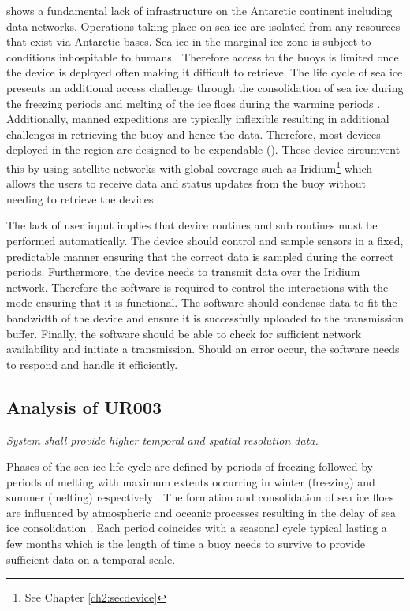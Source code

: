 \textcite{kennicutt2016delivering} shows a fundamental lack of infrastructure on the Antarctic continent including data networks. Operations taking place on sea ice are isolated from any resources that exist via Antarctic bases. Sea ice in the marginal ice zone is subject to conditions inhospitable to humans \cite{kennicutt2016delivering}. Therefore access to the buoys is limited once the device is deployed often making it difficult to retrieve. The life cycle of sea ice presents an additional access challenge through the consolidation of sea ice  during the freezing periods and melting  of the ice floes during the warming periods \cite{womack_2020}. Additionally, manned expeditions are typically inflexible \cite{kennicutt2016delivering} resulting in additional challenges in retrieving the buoy and hence the data. Therefore, most devices deployed in the region are designed to be expendable (\cite{kohout2015device,rabault2019open,trident}). These device circumvent this by using satellite networks with global coverage such as Iridium\footnote{See Chapter \ref{ch2:secdevice}} which allows the users to receive data and status updates from the buoy without needing to retrieve the devices. 

The lack of user input implies that device routines and sub routines must be performed automatically. The device should control and sample sensors in a fixed, predictable manner ensuring that the correct data is sampled during the correct periods. Furthermore, the device needs to transmit data over the Iridium network. Therefore the software is required to control the interactions with the mode ensuring that it is functional. The software should condense data to fit the bandwidth of the device and ensure it is successfully uploaded to the transmission buffer. Finally, the software should be able to check for sufficient network availability and initiate a transmission. Should an error occur, the software needs to respond and handle it efficiently.

\subsection{Analysis of UR003}
\textit{System shall provide higher temporal and spatial resolution data.}

Phases of the sea ice life cycle are defined by periods of freezing followed by periods of melting \cite{barber2005microwave} with maximum extents occurring in winter (freezing) and summer (melting) respectively \cite{barber2005microwave}. The formation and consolidation of sea ice floes are influenced by atmospheric and oceanic processes resulting in the delay of sea ice consolidation \cite{vichi2019effects,albarello2020drift}. Each period coincides with a seasonal cycle typical lasting a few months \cite{vichi2019effects,alberello2019drift,barber1948generation} which is the length of time a buoy needs to survive to provide sufficient data on a temporal scale. \par 

